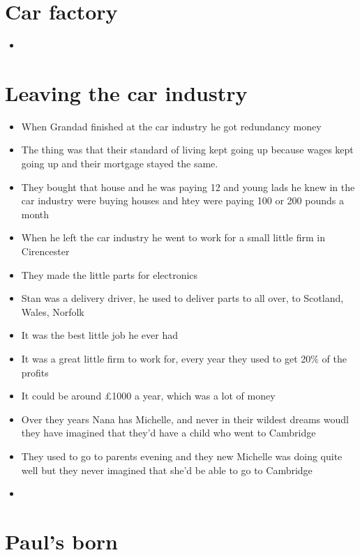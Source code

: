 \documentclass[10pt,twocolumn,letterpaper]{article}
\begin{document}
\section{Car factory}

\begin{itemize}
    \item 
\end{itemize}



\section{Leaving the car industry}

\begin{itemize}
    \item When Grandad finished at the car industry he got redundancy money
    \item The thing was that their standard of living kept going up because wages kept going up and their mortgage stayed the same.
    \item They bought that house and he was paying 12 and young lads he knew in the car industry were buying houses and htey were paying 100 or 200 pounds a month
    \item When he left the car industry he went to work for a small little firm in Cirencester
    \item They made the little parts for electronics
    \item Stan was a delivery driver, he used to deliver parts to all over, to Scotland, Wales, Norfolk
    \item It was the best little job he ever had
    \item It was a great little firm to work for, every year they used to get 20\% of the profits
    \item It could be around £1000 a year, which was a lot of money
    \item Over they years Nana has Michelle, and never in their wildest dreams woudl they have imagined that they'd have a child who went to Cambridge
    \item They used to go to parents evening and they new Michelle was doing quite well but they never imagined that she'd be able to go to Cambridge
    \item 
\end{itemize}



\section{Paul's born}
\end{document}

